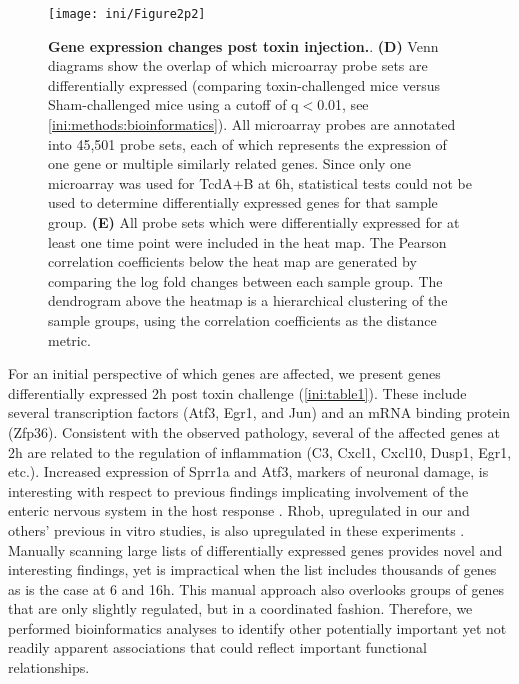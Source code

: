 \begin{SCfigure}
  \centering
  \texttt{[image: ini/Figure2p2]}
  \caption[Gene expression changes post toxin injection]{
       \textbf{Gene expression changes post toxin injection.}.
       \textbf{(D)} Venn diagrams show the overlap of which microarray 
       probe sets are differentially expressed (comparing toxin-challenged 
       mice versus Sham-challenged mice using a cutoff of q$<$0.01, see 
       \ref{ini:methods:bioinformatics}). All microarray probes are 
       annotated into 45,501 probe sets, each of which represents 
       the expression of one gene or multiple similarly related 
       genes. Since only one microarray was used for TcdA+B at 6h, 
       statistical tests could not be used to determine differentially 
       expressed genes for that sample group. \textbf{(E)} All probe 
       sets which were differentially expressed for at least one 
       time point were included in the heat map. The Pearson correlation 
       coefficients below the heat map are generated by comparing the 
       log fold changes between each sample group. The dendrogram above 
       the heatmap is a hierarchical clustering of the sample groups, 
       using the correlation coefficients as the distance metric.    
  }
  \label{ini:fig2p2}
\end{SCfigure}

For an initial perspective of which genes are affected, we present 
genes differentially expressed 2h post toxin challenge 
(\autoref{ini:table1}). These include several transcription factors 
(Atf3, Egr1, and Jun) and an mRNA binding protein (Zfp36). Consistent 
with the observed pathology, several of the affected genes at 2h are 
related to the regulation of inflammation (C3, Cxcl1, Cxcl10, Dusp1, 
Egr1, etc.). Increased expression of Sprr1a and Atf3, markers of 
neuronal damage, is interesting with respect to previous findings 
implicating involvement of the enteric nervous system in the host 
response \cite{Starkey:2009kn,Linhoff:2009dm}. Rhob, upregulated in 
our and others' previous in vitro studies, is also upregulated in 
these experiments \cite{DAuria:2012bd,Gerhard:2005dg}. Manually scanning 
large lists of differentially expressed genes provides novel and 
interesting findings, yet is impractical when the list includes 
thousands of genes as is the case at 6 and 16h. This manual approach 
also overlooks groups of genes that are only slightly regulated, 
but in a coordinated fashion. Therefore, we performed bioinformatics 
analyses to identify other potentially important yet not readily 
apparent associations that could reflect important functional relationships.

